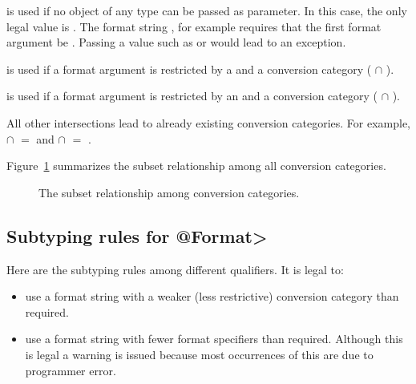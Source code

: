 \begin{description}
\item{} is used if no object of any type can be
    passed as parameter. In this case, the only legal value is .
    The format string , for example requires that the first
    format argument be .  Passing a value such as  or
     would lead to an exception.
\item{} is used if a format argument is restricted by a  and a  conversion category ( $\cap$ ).
\item{} is used if a format argument is restricted by an  and a  conversion category ( $\cap$ ).
\end{description}

\noindent All other intersections lead to already existing conversion categories.
For example,  $\cap$  $=$  and
 $\cap$  $=$ .

Figure~\ref{fig-formatter-cat} summarizes the subset
relationship among all conversion categories.

\begin{figure}[thbp]
    \caption{The subset relationship
        among conversion categories.}
    \label{fig-formatter-cat}
\end{figure}


\subsection{Subtyping rules for \<@Format>\label{formatter-format-subtyping}}

Here are the subtyping rules among different
qualifiers.
It is legal to:

\begin{itemize}
\item use a format string with a weaker (less restrictive) conversion category than required.
\item use a format string with fewer format specifiers than required.
  Although this is legal a warning is issued because most occurrences of
  this are due to programmer error.
\end{itemize}

